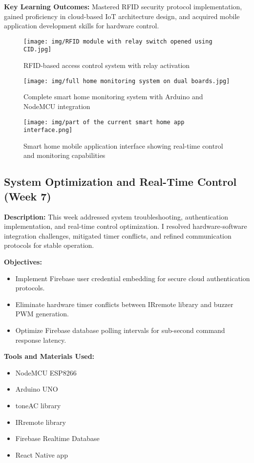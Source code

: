 \documentclass[12pt,a4paper]{report}
\begin{document}
\noindent\textbf{Key Learning Outcomes:} Mastered RFID security protocol implementation, gained proficiency in cloud-based IoT architecture design, and acquired mobile application development skills for hardware control.

\begin{figure}[H]
\centering
\texttt{[image: img/RFID module with relay switch opened using CID.jpg]}
\caption{RFID-based access control system with relay activation}
\label{fig:rfid-system}
\end{figure}

\begin{figure}[H]
\centering
\texttt{[image: img/full home monitoring system on dual boards.jpg]}
\caption{Complete smart home monitoring system with Arduino and NodeMCU integration}
\label{fig:full-system}
\end{figure}

\begin{figure}[H]
\centering
\texttt{[image: img/part of the current smart home app interface.png]}
\caption{Smart home mobile application interface showing real-time control and monitoring capabilities}
\label{fig:mobile-app}
\end{figure}

\subsection{System Optimization and Real-Time Control (Week 7)}

\noindent\textbf{Description:} This week addressed system troubleshooting, authentication implementation, and real-time control optimization. I resolved hardware-software integration challenges, mitigated timer conflicts, and refined communication protocols for stable operation.

\noindent\textbf{Objectives:}
\begin{itemize}
    \item Implement Firebase user credential embedding for secure cloud authentication protocols.
    \item Eliminate hardware timer conflicts between IRremote library and buzzer PWM generation.
    \item Optimize Firebase database polling intervals for sub-second command response latency.
\end{itemize}

\noindent\textbf{Tools and Materials Used:}
\begin{multicols}{2}
\begin{itemize}
    \item NodeMCU ESP8266
    \item Arduino UNO
    \item toneAC library
    \item IRremote library
    \item Firebase Realtime Database
    \item React Native app
\end{itemize}
\end{multicols}
\end{document}
